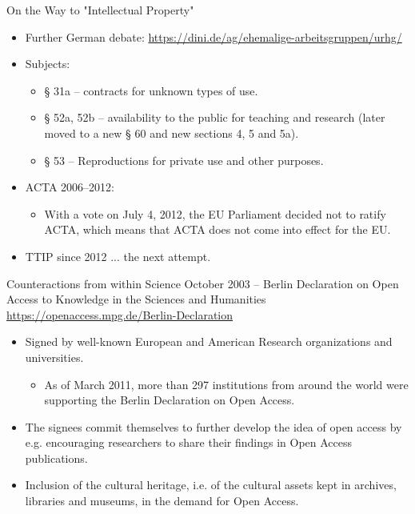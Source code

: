 \documentclass{beamer}
\begin{document}
\begin{frame}{On the Way to "Intellectual Property"}
\begin{itemize}
\item Further German debate:
  \url{https://dini.de/ag/ehemalige-arbeitsgruppen/urhg/}
\item Subjects:
  \begin{itemize}
  \item § 31a -- contracts for unknown types of use.
  \item § 52a, 52b -- availability to the public for teaching and research
    (later moved to a new § 60 and new sections 4, 5 and 5a).
  \item § 53 -- Reproductions for private use and other purposes.
  \end{itemize}
\item ACTA 2006--2012:
  \begin{itemize}
  \item With a vote on July 4, 2012, the EU Parliament decided not to ratify
    ACTA, which means that ACTA does not come into effect for the EU.
  \end{itemize}
\item TTIP since 2012 ... the next attempt.
\end{itemize}
\end{frame}

\begin{frame}{Counteractions from within Science}
October 2003 -- Berlin Declaration on Open Access to Knowledge in the Sciences
and Humanities \url{https://openaccess.mpg.de/Berlin-Declaration}
\begin{itemize}
\item Signed by well-known European and American Research organizations and
  universities.
  \begin{itemize}
  \item As of March 2011, more than 297 institutions from around the world
    were supporting the Berlin Declaration on Open Access.
  \end{itemize}
\item The signees commit themselves to further develop the idea of open
  access by e.g.  encouraging researchers to share their findings in Open
  Access publications.
\item Inclusion of the cultural heritage, i.e.  of the cultural assets kept in
  archives, libraries and museums, in the demand for Open Access.
\end{itemize}
\end{frame}
\end{document}

